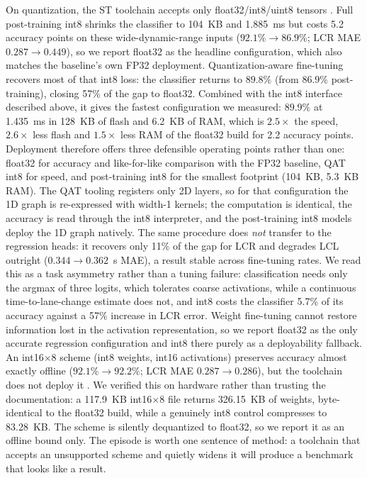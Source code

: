 \documentclass[journal]{IEEEtran}
\begin{document}
On quantization, the ST toolchain accepts only float32/int8/uint8
tensors \cite{stedgeai2026}. Full
post-training int8 shrinks the classifier to 104~KB and 1.885~ms but costs 5.2
accuracy points on these wide-dynamic-range inputs ($92.1\% \rightarrow 86.9\%$;
LCR MAE $0.287 \rightarrow 0.449$), so we report float32 as the headline
configuration, which also matches the baseline's own FP32 deployment.
Quantization-aware fine-tuning recovers most of that int8 loss: the classifier
returns to $89.8\%$ (from $86.9\%$ post-training), closing 57\% of the gap to
float32. Combined with the int8 interface described above, it gives the fastest
configuration we measured: $89.9\%$ at 1.435~ms in 128~KB of flash and 6.2~KB
of RAM, which is $2.5\times$ the speed, $2.6\times$ less flash and $1.5\times$
less RAM of the float32 build for 2.2 accuracy points. Deployment therefore
offers three defensible operating points rather than one: float32 for accuracy
and like-for-like comparison with the FP32 baseline, QAT int8 for speed, and
post-training int8 for the smallest footprint (104~KB, 5.3~KB RAM). The QAT
tooling registers only 2D layers, so for that configuration the 1D graph is
re-expressed with width-1 kernels; the computation is identical, the accuracy is
read through the int8 interpreter, and the post-training int8 models deploy the
1D graph natively. The same procedure does \emph{not} transfer to the regression
heads: it recovers only 11\% of the gap for LCR and degrades LCL outright
($0.344 \rightarrow 0.362$~s MAE), a result stable across fine-tuning rates. We
read this as a task asymmetry rather than a tuning failure: classification
needs only the argmax of three logits, which tolerates coarse activations, while
a continuous time-to-lane-change estimate does not, and int8 costs the
classifier 5.7\% of its accuracy against a 57\% increase in LCR error. Weight
fine-tuning cannot restore information lost in the activation representation, so
we report float32 as the only accurate regression configuration and int8 there
purely as a deployability fallback. An
int16$\times$8 scheme (int8 weights, int16 activations) preserves accuracy almost
exactly offline ($92.1\% \rightarrow 92.2\%$; LCR MAE
$0.287 \rightarrow 0.286$), but the toolchain does not deploy
it \cite{stedgeai2026}. We verified
this on hardware rather than trusting the documentation: a 117.9~KB
int16$\times$8 file returns 326.15~KB of weights, byte-identical to the float32
build, while a genuinely int8 control compresses to 83.28~KB. The scheme is
silently dequantized to float32, so we report it as an offline bound only. The
episode is worth one sentence of method: a toolchain that accepts an unsupported
scheme and quietly widens it will produce a benchmark that looks like a result.
\end{document}
